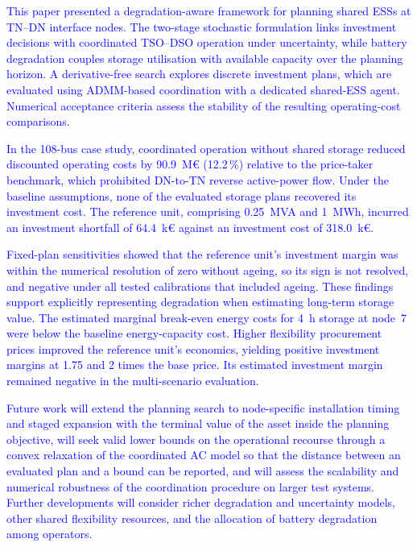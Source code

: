 \documentclass[preprint,12pt]{elsarticle}
\begin{document}
\textcolor{blue}{
    This paper presented a degradation-aware framework for planning shared ESSs at TN--DN interface nodes. The two-stage stochastic formulation links investment decisions with coordinated TSO--DSO operation under uncertainty, while battery degradation couples storage utilisation with available capacity over the planning horizon. A derivative-free search explores discrete investment plans, which are evaluated using ADMM-based coordination with a dedicated shared-ESS agent. Numerical acceptance criteria assess the stability of the resulting operating-cost comparisons.
}

\textcolor{blue}{
    In the 108-bus case study, coordinated operation without shared storage reduced discounted operating costs by 90.9~M\euro{} (12.2\,\%) relative to the price-taker benchmark, which prohibited DN-to-TN reverse active-power flow. Under the baseline assumptions, none of the evaluated storage plans recovered its investment cost. The reference unit, comprising 0.25~MVA and 1~MWh, incurred an investment shortfall of 64.4~k\euro{} against an investment cost of 318.0~k\euro{}.
}

\textcolor{blue}{
    Fixed-plan sensitivities showed that the reference unit's investment margin was within the numerical resolution of zero without ageing, so its sign is not resolved, and negative under all tested calibrations that included ageing. These findings support explicitly representing degradation when estimating long-term storage value. The estimated marginal break-even energy costs for 4~h storage at node~7 were below the baseline energy-capacity cost. Higher flexibility procurement prices improved the reference unit's economics, yielding positive investment margins at 1.75 and 2 times the base price. Its estimated investment margin remained negative in the multi-scenario evaluation.
}

\textcolor{blue}{
    Future work will extend the planning search to node-specific installation timing and staged expansion with the terminal value of the asset inside the planning objective, will seek valid lower bounds on the operational recourse through a convex relaxation of the coordinated AC model so that the distance between an evaluated plan and a bound can be reported, and will assess the scalability and numerical robustness of the coordination procedure on larger test systems. Further developments will consider richer degradation and uncertainty models, other shared flexibility resources, and the allocation of battery degradation among operators.
}
\end{document}
